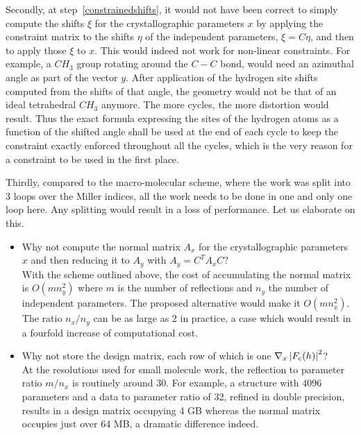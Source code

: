 \documentclass[12pt]{article}
\begin{document}
Secondly, at step~\ref{constrainedshifts}, it would not have been correct to simply compute the shifts $\xi$ for the crystallographic parameters $x$ by applying the constraint matrix to the shifts $\eta$ of the independent parameters, $\xi = C \eta$, and then to apply those $\xi$ to $x$. This would indeed not work for non-linear constraints. For example, a $CH_3$ group rotating around the $C-C$ bond, would need an azimuthal angle as part of the vector $y$. After application of the hydrogen site shifts computed from the shifts of that angle, the geometry would not be that of an ideal tetrahedral $CH_3$ anymore. The more cycles, the more distortion would result. Thus the exact formula expressing the sites of the hydrogen atoms as a function of the shifted angle shall be used at the end of each cycle to keep the constraint exactly enforced throughout all the cycles, which is the very reason for a constraint to be used in the first place.

Thirdly, compared to the macro-molecular scheme, where the work was split into 3 loops over the Miller indices, all the work needs to be done in one and only one loop here. Any splitting would result in a loss of performance. Let us elaborate on this.
\begin{itemize}
\item Why not compute the normal matrix $A_x$ for the crystallographic parameters $x$ and then reducing it to $A_y$ with $A_y = C^T A_x C$?\\
With the scheme outlined above, the cost of accumulating the normal matrix is $O(m n_y^2)$ where $m$ is the number of reflections and $n_y$ the number of independent parameters. The proposed alternative would make it $O(m n_x^2)$. The ratio $n_x/n_y$ can be as large as 2 in practice, a case which would result in a fourfold increase of computational cost.
\item Why not store the design matrix, each row of which is one $\nabla_x \left| F_c(h) \right|^2$?\\
At the resolutions used for small molecule work, the reflection to parameter ratio $m/n_x$ is routinely around 30. For example, a structure with 4096 parameters and a data to parameter ratio of 32, refined in double precision, results in a design matrix occupying 4 GB whereas the normal matrix occupies just over 64 MB, a dramatic difference indeed.
\end{itemize}
\end{document}
